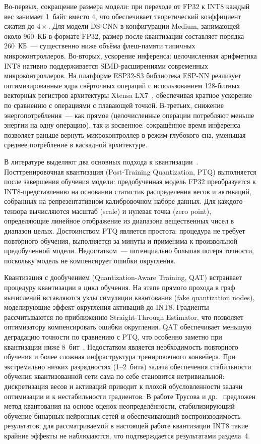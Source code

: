 Во-первых, сокращение размера модели: при переходе от FP32 к INT8 каждый
вес занимает 1~байт вместо 4, что обеспечивает теоретический коэффициент
сжатия до $4\times$. Для модели DS-CNN в конфигурации Medium,
занимающей около 960~КБ в формате FP32, размер после квантизации
составляет порядка 260~КБ~--- существенно ниже объёма флеш-памяти
типичных микроконтроллеров. Во-вторых, ускорение инференса:
целочисленная арифметика INT8 нативно поддерживается SIMD-расширениями
современных микроконтроллеров. На платформе ESP32-S3 библиотека ESP-NN
реализует оптимизированные ядра свёрточных операций с использованием
128-битных векторных регистров архитектуры Xtensa LX7~\cite{src:9},
обеспечивая кратное ускорение по сравнению с операциями с плавающей
точкой. В-третьих, снижение энергопотребления~--- как прямое
(целочисленные операции потребляют меньше энергии на одну операцию),
так и косвенное: сокращённое время инференса позволяет раньше вернуть
микроконтроллер в режим глубокого сна, уменьшая среднее потребление в
каскадной архитектуре.

В литературе выделяют два основных подхода к квантизации~\cite{src:3,
	src:22}. Посттренировочная квантизация (Post-Training Quantization, PTQ)
выполняется после завершения обучения модели: предобученная модель FP32
преобразуется к INT8-представлению на основании статистик распределения
весов и активаций, собранных на репрезентативном калибровочном наборе
данных. Для каждого тензора вычисляются масштаб (scale) и нулевая точка
(zero point), определяющие линейное отображение из диапазона вещественных
чисел в диапазон целых. Достоинством PTQ является простота: процедура не
требует повторного обучения, выполняется за минуты и применима к
произвольной предобученной модели. Недостатком~--- потенциально большая
потеря точности, поскольку модель не компенсирует ошибки округления.

Квантизация с дообучением (Quantization-Aware Training, QAT)
встраивает процедуру квантизации в цикл обучения. На этапе прямого
прохода в граф вычислений вставляются узлы симуляции квантования (fake
quantization nodes), моделирующие эффект округления активаций до INT8.
Градиенты рассчитываются по приближению Straight-Through Estimator, что
позволяет оптимизатору компенсировать ошибки округления. QAT обеспечивает
меньшую деградацию точности по сравнению с PTQ, что особенно заметно при
квантизации ниже 8~бит~\cite{src:3}. Недостатком является необходимость
повторного обучения и более сложная инфраструктура тренировочного
конвейера. При экстремально низких разрядностях (1--2~бита) задача
обеспечения стабильности обучения квантизованной сети сама по себе
становится нетривиальной: дискретизация весов и активаций приводит к
плохой обусловленности задачи оптимизации и к нестабильности градиентов.
В работе Трусова и др.~\cite{src:32} предложен метод квантования на
основе оценок неопределённости, стабилизирующий обучение бинарных
нейронных сетей и обеспечивающий воспроизводимость результатов; для
рассматриваемой в настоящей работе квантизации INT8 такие крайние
эффекты не наблюдаются, что подтверждается результатами раздела~4.

